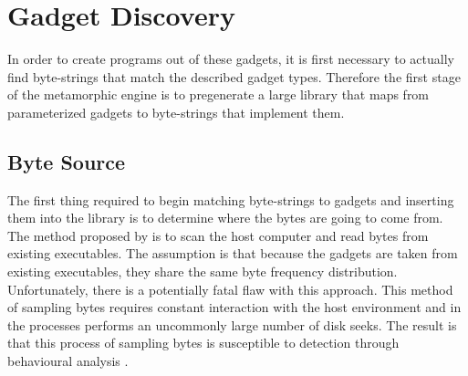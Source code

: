     \begin{table}
        \centering
        \caption[List of abstract statements.]
        {Enumeration of abstract statements and their semantic definitions. Note
        that parameters here are either variables or constants and that each
        statement has a clear correspondence with a gadget in
        \ref{tab:method-gadgets}}
        \label{tab:method-statements}
    \end{table}

    \section{Gadget Discovery}

    In order to create programs out of these gadgets, it is first necessary to
    actually find byte-strings that match the described gadget types. Therefore
    the first stage of the metamorphic engine is to pregenerate a large library
    that maps from parameterized gadgets to byte-strings that implement them.

    \subsection{Byte Source}

    The first thing required to begin matching byte-strings to gadgets and
    inserting them into the library is to determine where the bytes are going to
    come from. The method proposed by \cite{franken} is to scan the host
    computer and read bytes from existing executables. The assumption is that
    because the gadgets are taken from existing executables, they share the same
    byte frequency distribution. Unfortunately, there is a potentially fatal
    flaw with this approach. This method of sampling bytes requires constant
    interaction with the host environment and in the processes performs an
    uncommonly large number of disk seeks. The result is that this process of
    sampling bytes is susceptible to detection through behavioural analysis
    \cite{anon_evade}.

